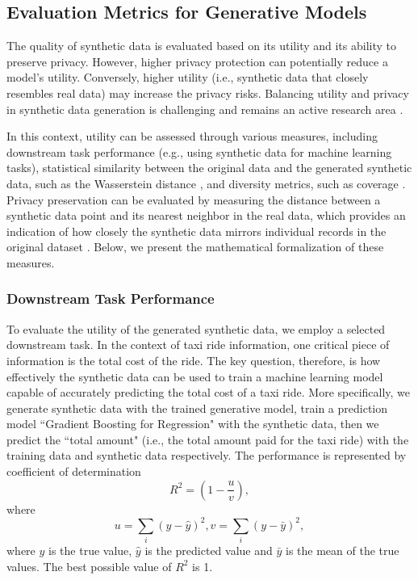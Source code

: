 
\subsection{Evaluation Metrics for Generative Models} \label{sec:metrics}
The quality of synthetic data is evaluated based on its utility and its ability to preserve privacy. However, higher privacy protection can potentially reduce a model's utility. Conversely, higher utility (i.e., synthetic data that closely resembles real data) may increase the privacy risks. Balancing utility and privacy in synthetic data generation is challenging and remains an active research area \cite{groundhog}. 

In this context, utility can be assessed through various measures, including downstream task performance (e.g., using synthetic data for machine learning tasks), statistical similarity between the original data and the generated synthetic data, such as the Wasserstein distance \cite{wasserstein-distance}, and diversity metrics, such as coverage \cite{coverage}. Privacy preservation can be evaluated by measuring the distance between a synthetic data point and its nearest neighbor in the real data, which provides an indication of how closely the synthetic data mirrors individual records in the original dataset \cite{hilprecht2019_gan_attack}. Below, we present the mathematical formalization of these measures.

\subsubsection{Downstream Task Performance} To evaluate the utility of the generated synthetic data, we employ a selected downstream task. In the context of taxi ride information, one critical piece of information is the total cost of the ride. The key question, therefore, is how effectively the synthetic data can be used to train a machine learning model capable of accurately predicting the total cost of a taxi ride. More specifically, we generate synthetic data with the trained generative model, train a prediction model ``Gradient Boosting for Regression" \cite{gradient_boosting} with the synthetic data, then we predict the ``total amount" (i.e., the total amount paid for the taxi ride) with the training data and synthetic data respectively. The performance is represented by coefficient of determination \cite{coefficient_determination}
\begin{equation}
   R^2=(1-\frac{u}{v}),
\end{equation}
where
\begin{equation}
   u=\sum_i(y-\hat{y})^2, v=\sum_i(y-\bar{y})^2,
\end{equation}
where $y$ is the true value, $\hat{y}$ is the predicted value and $\bar{y}$ is the mean of the true values. 
The best possible value of $R^2$ is 1.

